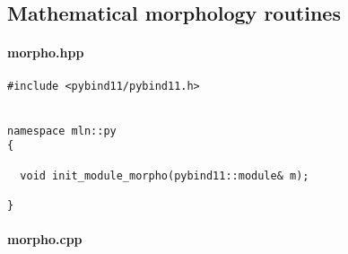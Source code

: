 \subsection{Mathematical morphology routines}
\label{appendix:static-dynamic-bridge.mm.algos}

\paragraph{morpho.hpp}

\begin{verbatim}
#include <pybind11/pybind11.h>


namespace mln::py
{

  void init_module_morpho(pybind11::module& m);

}
\end{verbatim}

\paragraph{morpho.cpp}

